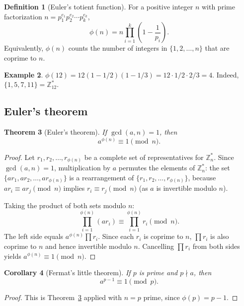 \documentclass[twoside,12pt]{book}
\theoremstyle{plain}
\newtheorem{theorem}{Theorem}[chapter]
\newtheorem{corollary}[theorem]{Corollary}
\theoremstyle{definition}
\newtheorem{definition}[theorem]{Definition}
\newtheorem{example}[theorem]{Example}
\theoremstyle{remark}
\begin{document}
\begin{definition}[Euler's totient function]
For a positive integer $n$ with prime factorization $n = p_1^{e_1} p_2^{e_2} \cdots p_k^{e_k}$,
\[
\phi(n) = n \prod_{i=1}^{k} \left(1 - \frac{1}{p_i}\right).
\]
Equivalently, $\phi(n)$ counts the number of integers in $\{1, 2, \ldots, n\}$ that are coprime to $n$.
\end{definition}

\begin{example}
$\phi(12) = 12(1 - 1/2)(1 - 1/3) = 12 \cdot 1/2 \cdot 2/3 = 4$. Indeed, $\{1, 5, 7, 11\} = \mathbb{Z}_{12}^*$.
\end{example}

\subsection{Euler's theorem}

\begin{theorem}[Euler's theorem]
\label{thm:euler}
If $\gcd(a, n) = 1$, then
\[
a^{\phi(n)} \equiv 1 \pmod{n}.
\]
\end{theorem}

\begin{proof}
Let $r_1, r_2, \ldots, r_{\phi(n)}$ be a complete set of representatives for $\mathbb{Z}_n^*$. Since $\gcd(a, n) = 1$, multiplication by $a$ permutes the elements of $\mathbb{Z}_n^*$: the set $\{ar_1, ar_2, \ldots, ar_{\phi(n)}\}$ is a rearrangement of $\{r_1, r_2, \ldots, r_{\phi(n)}\}$, because $ar_i \equiv ar_j \pmod{n}$ implies $r_i \equiv r_j \pmod{n}$ (as $a$ is invertible modulo $n$).

Taking the product of both sets modulo $n$:
\[
\prod_{i=1}^{\phi(n)} (ar_i) \equiv \prod_{i=1}^{\phi(n)} r_i \pmod{n}.
\]
The left side equals $a^{\phi(n)} \prod r_i$. Since each $r_i$ is coprime to $n$, $\prod r_i$ is also coprime to $n$ and hence invertible modulo $n$. Cancelling $\prod r_i$ from both sides yields $a^{\phi(n)} \equiv 1 \pmod{n}$.
\end{proof}

\begin{corollary}[Fermat's little theorem]
\label{thm:fermat}
If $p$ is prime and $p \nmid a$, then
\[
a^{p-1} \equiv 1 \pmod{p}.
\]
\end{corollary}

\begin{proof}
This is Theorem~\ref{thm:euler} applied with $n = p$ prime, since $\phi(p) = p - 1$.
\end{proof}
\end{document}
